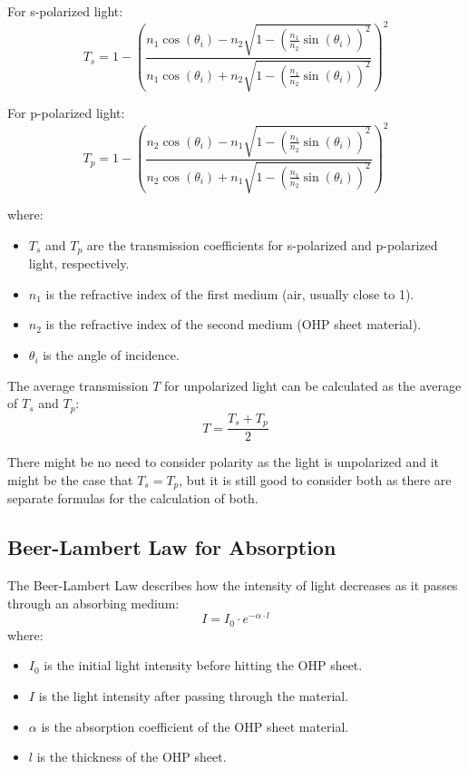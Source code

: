 For s-polarized light:
\[ T_s = 1 - \left( \frac{n_1 \cos(\theta_i) - n_2 \sqrt{1 - \left(\frac{n_1}{n_2} \sin(\theta_i)\right)^2}}{n_1 \cos(\theta_i) + n_2 \sqrt{1 - \left(\frac{n_1}{n_2} \sin(\theta_i)\right)^2}} \right)^2 \]

For p-polarized light:
\[ T_p = 1 - \left( \frac{n_2 \cos(\theta_i) - n_1 \sqrt{1 - \left(\frac{n_1}{n_2} \sin(\theta_i)\right)^2}}{n_2 \cos(\theta_i) + n_1 \sqrt{1 - \left(\frac{n_1}{n_2} \sin(\theta_i)\right)^2}} \right)^2 \]

where:
\begin{itemize}
    \item \( T_s \) and \( T_p \) are the transmission coefficients for s-polarized and p-polarized light, respectively.
    \item \( n_1 \) is the refractive index of the first medium (air, usually close to 1).
    \item \( n_2 \) is the refractive index of the second medium (OHP sheet material).
    \item \( \theta_i \) is the angle of incidence.
\end{itemize}

The average transmission \( T \) for unpolarized light can be calculated as the average of \( T_s \) and \( T_p \):
\[ T = \frac{T_s + T_p}{2} \]

There might be no need to consider polarity as the light is unpolarized and it might be the case that \(T_s = T_p\), but it is still good to consider both 
as there are separate formulas for the calculation of both.


\subsection{Beer-Lambert Law for Absorption} \label{sec:absorption}
The Beer-Lambert Law \citep{eschede2017optics} describes how the intensity of light decreases as it passes through an absorbing medium:
\[ I = I_0 \cdot e^{-\alpha \cdot l} \]
where:
\begin{itemize}
    \item \(I_0\) is the initial light intensity before hitting the OHP sheet.
    \item \(I\) is the light intensity after passing through the material.
    \item \(\alpha\) is the absorption coefficient of the OHP sheet material.
    \item \(l\) is the thickness of the OHP sheet.
\end{itemize}

